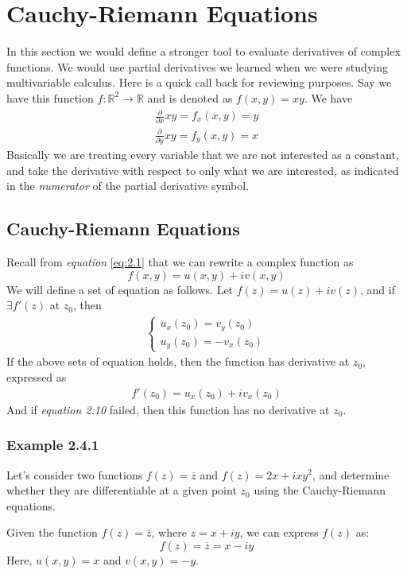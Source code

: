 \documentclass[12pt]{book}
\newcommand{\R}{\mathbb{R}}
\newcommand{\pypx}[2]{\frac{\partial #1}{\partial #2}}
\begin{document}
\section{Cauchy-Riemann Equations}

In this section we would define a stronger tool to evaluate derivatives of complex functions. We would use partial derivatives we learned when we were studying multivariable calculus. Here is a quick call back for reviewing purposes. Say we have this function $f \colon \R^2 \to \R$ and is denoted as $f(x,y) = xy$. We have
\begin{align}
\pypx{}{x}xy= f_x(x,y) = y\\
\pypx{}{y}xy = f_y(x,y) = x
\end{align}
Basically we are treating every variable that we are not interested as a constant, and take the derivative with respect to only what we are interested, as indicated in the \textit{numerator} of the partial derivative symbol.

\subsection{Cauchy-Riemann Equations}
Recall from \textit{equation} \ref{eq:2.1} that we can rewrite a complex function as
\[
f(x,y) = u(x,y) + iv(x,y)
\]
We will define a set of equation as follows. Let $f(z) = u(z)+iv(z)$, and if $\exists f'(z)$ at $z_0$, then
\begin{align}
    \begin{cases}
        u_x(z_0) = v_y(z_0)\\
        u_y(z_0) = -v_x(z_0)
    \end{cases}
\end{align}
If the above sets of equation holds, then the function has derivative at $z_0$, expressed as
\begin{align}
    f'(z_0) = u_x(z_0) + iv_x(z_0)
\end{align}
And if \textit{equation 2.10} failed, then this function has no derivative at $z_0$.

\subsubsection{Example 2.4.1}

Let's consider two functions \( f(z) = \overline{z} \) and \( f(z) = 2x + ixy^2 \), and determine whether they are differentiable at a given point \( z_0 \) using the Cauchy-Riemann equations.


Given the function \( f(z) = \overline{z} \), where \( z = x + iy \), we can express \( f(z) \) as:
\[
f(z) = \overline{z} = x - iy
\]
Here, \( u(x,y) = x \) and \( v(x,y) = -y \).
\end{document}
